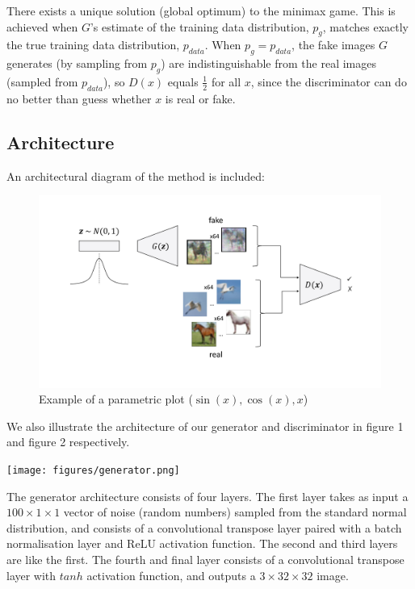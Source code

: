 \documentclass{article}
\begin{document}
There exists a unique solution (global optimum) to the minimax game. This is achieved when $G$'s estimate of the training data distribution, $p_g$, matches exactly the true training data distribution, $p_{data}$. When $p_g = p_{data}$, the fake images $G$ generates (by sampling from $p_g$) are indistinguishable from the real images (sampled from $p_{data}$), so $D(x)$ equals $\frac{1}{2}$ for all $x$, since the discriminator can do no better than guess whether $x$ is real or fake.

\subsection{Architecture}
An architectural diagram of the method is included:
\begin{figure}[h]
    \begin{center}
        \includegraphics[width=1\textwidth]{figures/architecture.pdf}
    \end{center}
    \caption{Example of a parametric plot ($\sin (x), \cos(x), x$)}
\end{figure}
We also illustrate the architecture of our generator and discriminator in figure 1 and figure 2 respectively. 

\begin{center}
    \texttt{[image: figures/generator.png]}
\end{center}

The generator architecture consists of four layers. The first layer takes as input a $100 \times 1 \times 1$ vector of noise (random numbers) sampled from the standard normal distribution, and consists of a convolutional transpose layer paired with a batch normalisation layer and ReLU activation function. The second and third layers are like the first. The fourth and final layer consists of a convolutional transpose layer with $tanh$ activation function, and outputs a $3 \times 32 \times 32$ image.  
\end{document}
